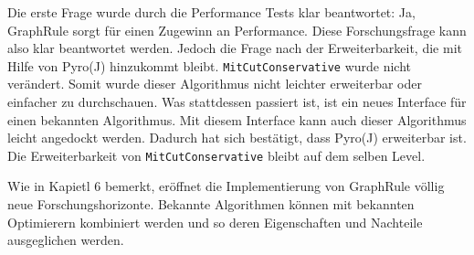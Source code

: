 Die erste Frage wurde durch die Performance Tests klar beantwortet: Ja, GraphRule sorgt für einen Zugewinn an Performance. Diese Forschungsfrage kann also klar beantwortet werden. Jedoch die Frage nach der Erweiterbarkeit, die mit Hilfe von Pyro(J) hinzukommt bleibt. \texttt{MitCutConservative} wurde nicht verändert. Somit wurde dieser Algorithmus nicht leichter erweiterbar oder einfacher zu durchschauen. Was stattdessen passiert ist, ist ein neues Interface für einen bekannten Algorithmus. Mit diesem Interface kann auch dieser Algorithmus leicht angedockt werden. Dadurch hat sich bestätigt, dass Pyro(J) erweiterbar ist. Die Erweiterbarkeit von \texttt{MitCutConservative} bleibt auf dem selben Level.

Wie in Kapietl 6 bemerkt, eröffnet die Implementierung von GraphRule völlig neue Forschungshorizonte. Bekannte Algorithmen können mit bekannten Optimierern kombiniert werden und so deren Eigenschaften und Nachteile ausgeglichen werden.